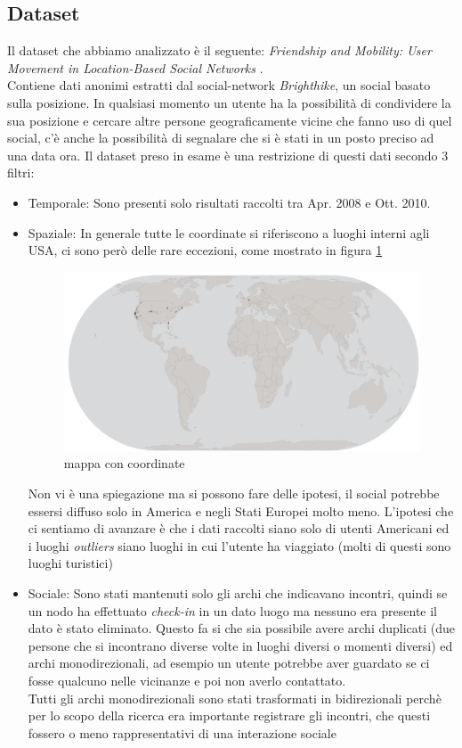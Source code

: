 \documentclass[a4paper]{article}
\begin{document}
\subsection{Dataset}
Il dataset che abbiamo analizzato è il seguente: \textit{ Friendship and Mobility: User Movement in Location-Based Social Networks }\cite{original_paper}.\\
Contiene dati anonimi estratti dal social-network \textit{Brighthike}, un social basato sulla posizione.
In qualsiasi momento un utente ha la possibilità di condividere la sua posizione e cercare altre persone geograficamente vicine che fanno uso di quel social, c'è anche la possibilità di segnalare che si è stati in un posto preciso ad una data ora.
Il dataset preso in esame è una restrizione di questi dati secondo 3 filtri:
\begin{itemize}
	\item Temporale: Sono presenti solo risultati raccolti tra Apr. 2008 e Ott. 2010.
	\item Spaziale: In generale tutte le coordinate si riferiscono a luoghi interni agli USA, ci sono però delle rare eccezioni, come mostrato in figura \ref{FIG:posizione_generica}
		\begin{figure}[!ht]
			\centering
			\includegraphics[width=\linewidth]{posizione_generica}
			\caption{mappa con coordinate}
			\label{FIG:posizione_generica}
		\end{figure}
		Non vi è una spiegazione ma si possono fare delle ipotesi, il social potrebbe essersi diffuso solo in America e negli Stati Europei molto meno.
		L'ipotesi che ci sentiamo di avanzare è che i dati raccolti siano solo di utenti Americani ed i luoghi \textit{outliers} siano luoghi in cui l'utente ha viaggiato (molti di questi sono luoghi turistici)
	\item Sociale: Sono stati mantenuti solo gli archi che indicavano incontri, quindi se un nodo ha effettuato \textit{check-in} in un dato luogo ma nessuno era presente il dato è stato eliminato.
		Questo fa si che sia possibile avere archi duplicati (due persone che si incontrano diverse volte in luoghi diversi o momenti diversi) ed archi monodirezionali, ad esempio un utente potrebbe aver guardato se ci fosse qualcuno nelle vicinanze e poi non averlo contattato.\\
		Tutti gli archi monodirezionali sono stati trasformati in bidirezionali perchè per lo scopo della ricerca era importante registrare gli incontri, che questi fossero o meno rappresentativi di una interazione sociale
\end{itemize}
\end{document}
